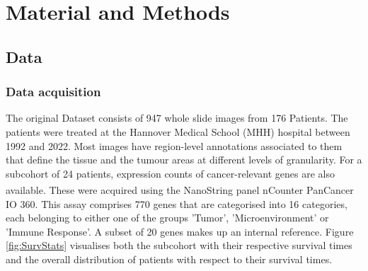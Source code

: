 
\chapter{Material and Methods}
  \label{MetMat}

\section{Data}
  \label{Data} 
  
\subsection{Data acquisition}
  \label{DataAcq}

The original Dataset consists of 947 whole slide images from 176 Patients. The patients were treated at the Hannover Medical School (MHH) hospital between 1992 and 2022. Most images have region-level annotations associated to them that define the tissue and the tumour areas at different levels of granularity.
For a subcohort of 24 patients, expression counts of cancer-relevant genes are also available. These were acquired using the NanoString panel nCounter\textsuperscript{\textregistered} PanCancer IO 360\texttrademark. This assay comprises 770 genes that are categorised into 16 categories, each belonging to either one of the groups 'Tumor', 'Microenvironment' or 'Immune Response'. A subset of 20 genes makes up an internal reference. \cite{NanoStringTechnologies2017Gene}
Figure \ref{fig:SurvStats} visualises both the subcohort with their respective survival times and the overall distribution of patients  with respect to their survival times.


